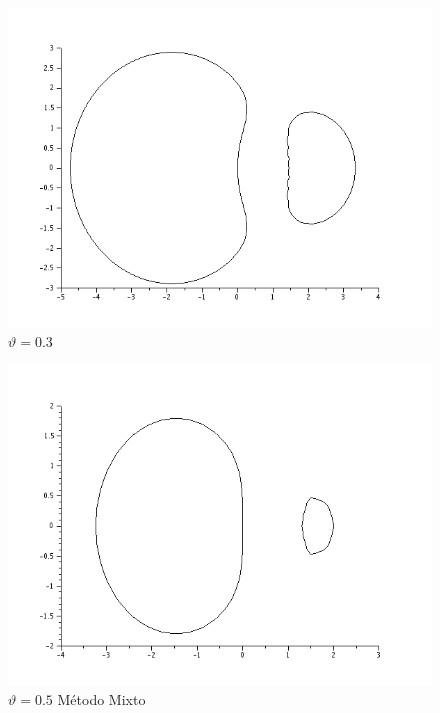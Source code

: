 \documentclass{article}
\begin{document}
\begin{itemize}
\begin{figure}[H]
\includegraphics[width=\textwidth]{img/ej6-9.png}
\caption{$\vartheta = 0.3$ }
\end{figure}

\begin{figure}[H]
\includegraphics[width=\textwidth]{img/ej6-10.png}
\caption{$\vartheta = 0.5$ Método Mixto}
\end{figure}


\end{itemize}
\end{document}
